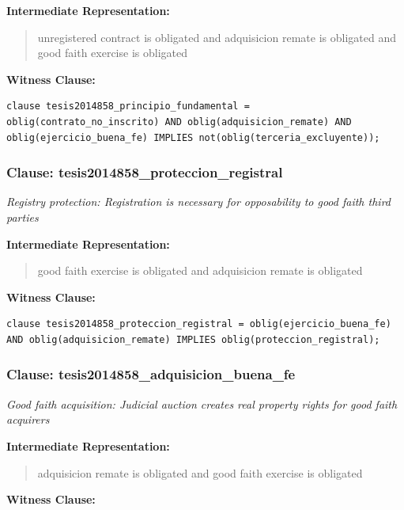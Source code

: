 \documentclass[11pt,a4paper]{article}
\begin{document}
\textbf{Intermediate Representation:}

\begin{quote}
unregistered contract is obligated and adquisicion remate is obligated and good faith exercise is obligated
\end{quote}

\textbf{Witness Clause:}

\begin{lstlisting}[style=witnessstyle, language=Witness]
clause tesis2014858_principio_fundamental = oblig(contrato_no_inscrito) AND oblig(adquisicion_remate) AND oblig(ejercicio_buena_fe) IMPLIES not(oblig(terceria_excluyente));
\end{lstlisting}

\subsubsection{Clause: tesis2014858\_proteccion\_registral}

\textit{Registry protection: Registration is necessary for opposability to good faith third parties}

\textbf{Intermediate Representation:}

\begin{quote}
good faith exercise is obligated and adquisicion remate is obligated
\end{quote}

\textbf{Witness Clause:}

\begin{lstlisting}[style=witnessstyle, language=Witness]
clause tesis2014858_proteccion_registral = oblig(ejercicio_buena_fe) AND oblig(adquisicion_remate) IMPLIES oblig(proteccion_registral);
\end{lstlisting}

\subsubsection{Clause: tesis2014858\_adquisicion\_buena\_fe}

\textit{Good faith acquisition: Judicial auction creates real property rights for good faith acquirers}

\textbf{Intermediate Representation:}

\begin{quote}
adquisicion remate is obligated and good faith exercise is obligated
\end{quote}

\textbf{Witness Clause:}
\end{document}
